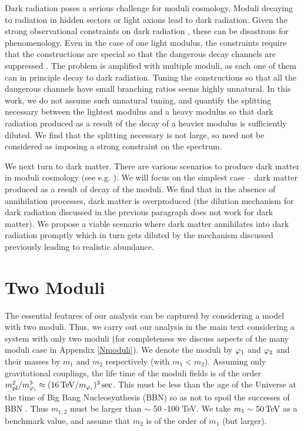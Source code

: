 \documentclass[12pt]{article}
\numberwithin{equation}{section}
\def\TeV{{\, \rm TeV}}
\begin{document}
Dark radiation poses a serious challenge for moduli cosmology. Moduli decaying to radiation in hidden sectors or light axions lead to dark radiation.
Given the strong observational constraints on dark radiation \cite{planck}, these can be disastrous for phenomenology. Even in the case of one light
modulus, the constraints require that the constructions are special so that the dangerous decay channels are suppressed \cite{drst}.
The problem is amplified with multiple moduli, as each one of them can in principle decay to dark radiation. Tuning the constructions so that all
the dangerous channels have small branching ratios seems highly unnatural. In this work, we do not assume such unnatural tuning, and quantify
the splitting necessary between the lightest modulus and a heavy modulus so that dark radiation produced as a result of the decay of a heavier
modulus is sufficiently diluted. We find that the splitting necessary is not large, so need not be considered as imposing a strong constraint on
 the spectrum. 



We next turn to dark matter. There are
various scenarios to produce dark matter in moduli cosmology (see e.g. \cite{mdm, ann, pk, modr}).  We will focus on the simplest case --  
dark matter produced as a result of decay of the moduli. We find that in the absence of annihilation processes, dark matter is overproduced
(the dilution mechanism for dark radiation discussed in the previous paragraph does not work for dark matter). We propose a viable scenario where
dark matter annihilates into dark radiation promptly
which in turn gets diluted by the mechanism discussed previously leading to realistic abundance. 
   
  
  
\section{Two Moduli}

The essential features of our analysis can be captured by considering a model with two moduli. Thus, we carry out our analysis in the main
text considering a system with only two moduli (for completeness we discuss aspects of the many moduli case in Appendix \ref{Nmoduli}).
We denote the moduli by $\varphi_{\rm 1}$ and $\varphi_{\rm 2}$ and their masses by $m_1$ and $m_2$ respectively (with  $m_1 < m_2$).
Assuming only gravitational couplings, the life time of the moduli fields is of the order
$m_{\rm pl}^2/m_{\varphi_i}^3 \approx (16 \TeV / m_{\varphi_i})^3 \, \text{sec}$. This must be less than the age of the Universe at the time
of Big Bang Nucleosynthesis (BBN) so as not to spoil the successes of BBN \cite{mod1}. Thus $m_{1,2}$ must be
larger than $\sim$ 50 -100 TeV. We take $m_{1} \sim 50 \TeV$ as a benchmark value, and assume that $m_2$  is of the order of $m_1$ (but larger).
\end{document}
